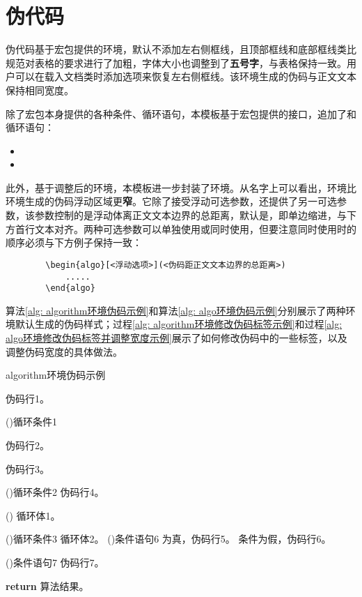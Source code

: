 \documentclass[print, promaster, vlined]{DissertUESTC}
\begin{document}
	\clearpage
	\section{伪代码}
	
	伪代码基于宏包提供的环境，默认不添加左右侧框线，且顶部框线和底部框线类比规范对表格的要求进行了加粗，字体大小也调整到了\textbf{五号字}，与表格保持一致。用户可以在载入文档类时添加选项来恢复左右侧框线。该环境生成的伪码与正文文本保持相同宽度。
	
	除了宏包本身提供的各种条件、循环语句，本模板基于宏包提供的接口，追加了和循环语句：
	\begin{itemize}
		\item {}
		\item {}
	\end{itemize}
	
	
	此外，基于调整后的环境，本模板进一步封装了环境。从名字上可以看出，环境比环境生成的伪码浮动区域更\textbf{窄}。它除了接受浮动可选参数\shad{[htbp]}，还提供了另一可选参数，该参数控制的是浮动体离正文文本边界的总距离，默认是\shad{4em}，即单边缩进\shad{2em}，与下方首行文本对齐。两种可选参数可以单独使用或同时使用，但要注意同时使用时的顺序必须与下方例子保持一致：
	
	\begin{verbatim}
		\begin{algo}[<浮动选项>](<伪码距正文文本边界的总距离>)
		    .....
		\end{algo}
	\end{verbatim}
	
	算法\ref{alg: algorithm环境伪码示例}和算法\ref{alg: algo环境伪码示例}分别展示了两种环境默认生成的伪码样式；过程\ref{alg: algorithm环境修改伪码标签示例}和过程\ref{alg: algo环境修改伪码标签并调整宽度示例}展示了如何修改伪码中的一些标签，以及调整伪码宽度的具体做法。

	
	\begin{algorithm}[!h]
		\caption{algorithm环境伪码示例} \label{alg: algorithm环境伪码示例}
		伪码行1。
		
		\For(){循环条件1}{
			伪码行2。
			
			伪码行3。
			
			\DoWhile(){循环条件2}{
				伪码行4。
			}
			
			\Loop(){
				循环体1。
			}
			
			\Repeat(){循环条件3}{
				循环体2。
			}
			\eIf(){条件语句6}{
				为真，伪码行5。
			}{
				条件为假，伪码行6。
			}
			
			\If(){条件语句7}{
				伪码行7。
			}
		}
		\textbf{return} 算法结果。
	\end{algorithm}
	
\end{document}
